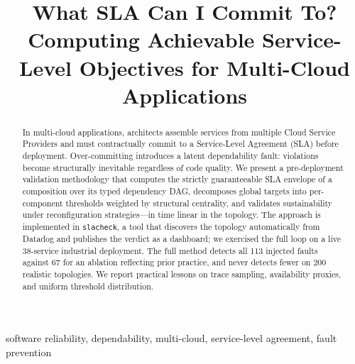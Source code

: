 \documentclass[conference]{IEEEtran}
\begin{document}
\title{What SLA Can I Commit To? Computing Achievable Service-Level Objectives for Multi-Cloud Applications}

\author{
}

\maketitle

\begin{abstract}
In multi-cloud applications, architects assemble services from multiple Cloud Service Providers and must contractually commit to a Service-Level Agreement (SLA) before deployment. Over-committing introduces a latent dependability fault: violations become structurally inevitable regardless of code quality. We present a pre-deployment validation methodology that computes the strictly guaranteeable SLA envelope of a composition over its typed dependency DAG, decomposes global targets into per-component thresholds weighted by structural centrality, and validates sustainability under reconfiguration strategies---in time linear in the topology. The approach is implemented in \texttt{slacheck}, a tool that discovers the topology automatically from Datadog and publishes the verdict as a dashboard; we exercised the full loop on a live 38-service industrial deployment. The full method detects all 113 injected faults against 67 for an ablation reflecting prior practice, and never detects fewer on 200 realistic topologies. We report practical lessons on trace sampling, availability proxies, and uniform threshold distribution.
\end{abstract}

\begin{IEEEkeywords}
software reliability, dependability, multi-cloud, service-level agreement,
fault prevention
\end{IEEEkeywords}

\end{document}
